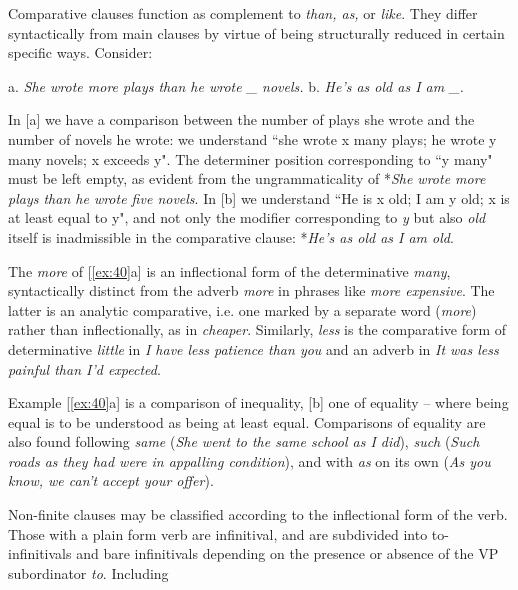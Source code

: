 Comparative clauses function as complement to \textit{than, as,} or \textit{like}. They differ syntactically from main clauses by virtue of being structurally reduced in certain specific ways. Consider:
\begin{examples}
\item \label{ex:40}
        a. \textit{She wrote more plays than \ob he wrote \_ novels\cb.} \hspace{2em} b. \textit{He's as old as \ob I am \_\cb.}
\end{examples}
In [a] we have a comparison between the number of plays she wrote and the number of novels he wrote: we understand ``she wrote x many plays; he wrote y many novels; x exceeds y". The determiner position corresponding to ``y many" must be left empty, as evident from the ungrammaticality of *\textit{She wrote more plays than he wrote five novels}. In [b] we understand ``He is x old; I am y old; x is at least equal to y", and not only the modifier corresponding to \textit{y} but also \textit{old} itself is inadmissible in the comparative clause: *\textit{He's as old as I am old}.

The \textit{more} of [\ref{ex:40}a] is an inflectional form of the determinative \textit{many}, syntactically distinct from the adverb \textit{more} in phrases like \textit{more expensive}. The latter is an {analytic comparative}, i.e. one marked by a separate word (\textit{more}) rather than inflectionally, as in \textit{cheaper}. Similarly, \textit{less} is the comparative form of determinative \textit{little} in \textit{I have less patience than you} and an adverb in \textit{It was less painful than I'd expected}.

Example [\ref{ex:40}a] is a {comparison of inequality}, [b] one of {equality} -- where being equal is to be understood as being at least equal. Comparisons of equality are also found following \textit{same} (\textit{She went to the same school as I did}), \textit{such} (\textit{Such roads as they had were in appalling condition}), and with \textit{as} on its own (\textit{As you know, we can't accept your offer}).


Non-finite clauses may be classified according to the inflectional form of the verb. Those with a plain form verb are infinitival, and are subdivided into to-infinitivals and bare infinitivals depending on the presence or absence of the VP subordinator \textit{to}. Including

\newpage

